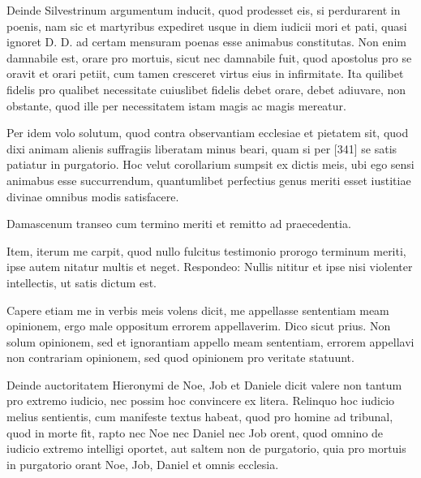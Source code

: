 Deinde Silvestrinum argumentum inducit, quod prodesset eis, si perdurarent in poenis, nam sic et martyribus expediret usque in diem iudicii mori et pati, quasi ignoret D. D. ad certam mensuram poenas esse animabus constitutas. Non enim damnabile est, orare pro mortuis, sicut nec damnabile fuit, quod apostolus pro se oravit et orari petiit, cum tamen cresceret virtus eius in infirmitate. Ita quilibet fidelis pro qualibet necessitate cuiuslibet fidelis debet orare, debet adiuvare, non obstante, quod ille per necessitatem istam magis ac magis mereatur.

Per idem volo solutum, quod contra observantiam ecclesiae et pietatem sit, quod dixi animam alienis suffragiis liberatam minus beari, quam si per [341] se satis patiatur in purgatorio. Hoc velut corollarium sumpsit ex dictis meis, ubi ego sensi animabus esse succurrendum, quantumlibet perfectius genus meriti esset iustitiae divinae omnibus modis satisfacere.

Damascenum transeo cum termino meriti et remitto ad praecedentia.

Item, iterum me carpit, quod nullo fulcitus testimonio prorogo terminum meriti, ipse autem nitatur multis et neget. Respondeo: Nullis nititur et ipse nisi violenter intellectis, ut satis dictum est.

Capere etiam me in verbis meis volens dicit, me appellasse sententiam meam opinionem, ergo male oppositum errorem appellaverim. Dico sicut prius. Non solum opinionem, sed et ignorantiam appello meam sententiam, errorem appellavi non contrariam opinionem, sed quod opinionem pro veritate statuunt.

Deinde auctoritatem Hieronymi de Noe, Job et Daniele dicit valere non tantum pro extremo iudicio, nec possim hoc convincere ex litera. Relinquo hoc iudicio melius sentientis, cum manifeste textus habeat, quod pro homine ad tribunal, quod in morte fit, rapto nec Noe nec Daniel nec Job orent, quod omnino de iudicio extremo intelligi oportet, aut saltem non de purgatorio, quia pro mortuis in purgatorio orant Noe, Job, Daniel et omnis ecclesia.

